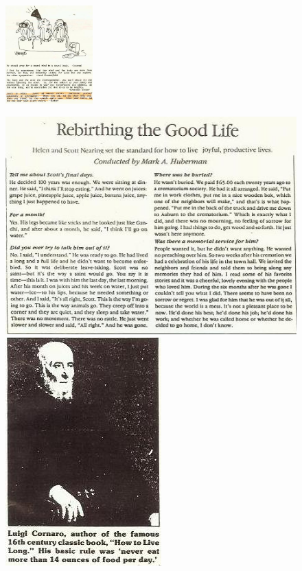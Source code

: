 \documentclass[landscape,twocolumn,letterpaper]{article}
\begin{document}
\begin{figure} 
  \centering
  \includegraphics[width=0.3\textwidth,bb= 0 0 329 253]{p36.jpg}
\end{figure}


\newpage\thispagestyle{empty}

\begin{figure}
  \centering

  \includegraphics[height=0.5\textheight,bb= 0 0 470
352]{scott-nearing.jpg}

  \includegraphics[height=0.4\textheight,bb= 0 0 227 332]{luigi.jpg}
\end{figure}
\end{document}
